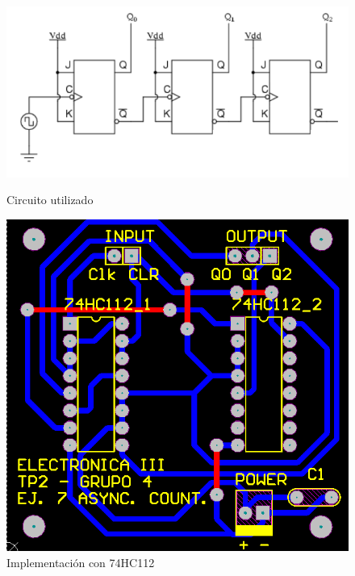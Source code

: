 \begin{figure}[H]
\begin{center}
  \begin{minipage}[b]{0.4\textwidth}
  	\begin{center}
  		\includegraphics[scale=0.5]{ejercicio7/imagenes/asynccircuito.png}
  	\end{center}
  \caption{Circuito utilizado}
  \label{7_fig1}
  \end{minipage}
  \begin{minipage}[b]{0.4\textwidth}
    \begin{center}
  		\includegraphics[scale=0.25]{ejercicio7/imagenes/asyncaltium.png}
	\end{center}
  \caption{Implementación con 74HC112}
  \label{7_fig2}
 \end{minipage}
\end{center}
\end{figure}


